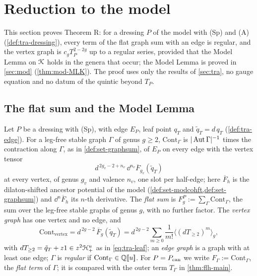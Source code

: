 
\section{Reduction to the model}
\label{sec:red}

This section proves Theorem R: for a dressing $P$ of the model with (Sp) and (A) (\cref{def:tra-dressing}), every term of the flat graph sum with an edge is regular, and the vertex graph is $c_gT_P^{2-2g}$ up to a regular series, provided that the Model Lemma on $\mathcal{K}$ holds in the genera that occur; the Model Lemma is proved in \cref{sec:mod} (\cref{thm:mod-MLK}). The proof uses only the results of \cref{sec:tra}, no gauge equation and no datum of the quintic beyond $T_P$.

\subsection{The flat sum and the Model Lemma}
\label{sec:red-sum}

\begin{defn}
\label{def:red-flatsum}
Let $P$ be a dressing with (Sp), with edge $E_P$, leaf point $q_T$ and $\tilde q_T = d\,q_T$ (\cref{def:tra-edge}). For a leg-free stable graph $\Gamma$ of genus $g\geq 2$, $\mathrm{Cont}_\Gamma$ is $|\operatorname{Aut}\Gamma|^{-1}$ times the contraction along $\Gamma$, as in \cref{def:set-graphsum}, of $E_P$ on every edge with the vertex tensor
\[
d^{\,2g_v-2+n_v}\,\dd^{n_v}\overline F_{g_v}(\tilde q_T)
\]
at every vertex, of genus $g_v$ and valence $n_v$, one slot per half-edge; here $\overline F_h$ is the dilaton-shifted ancestor potential of the model (\cref{def:set-modcohft,def:set-graphsum}) and $\dd^n\overline F_h$ its $n$-th derivative. The \emph{flat sum} is $F^P_g := \sum_\Gamma\mathrm{Cont}_\Gamma$, the sum over the leg-free stable graphs of genus $g$, with no further factor. The \emph{vertex graph} has one vertex and no edge, and
\begin{equation}
\label{eq:red-vertex}
\mathrm{Cont}_{\mathrm{vertex}} = d^{\,2g-2}\,\overline F_g(\tilde q_T) = d^{\,2g-2}\sum_{m\geq 0}\frac1{m!}\langle(dT_{\geq 2})^m\rangle_g ,
\end{equation}
with $dT_{\geq 2} = \tilde q_T+z1\in z^2\mathcal{H}^u_+$ as in \eqref{eq:tra-leaf};
an \emph{edge graph} is a graph with at least one edge; $\Gamma$ is \emph{regular} if $\mathrm{Cont}_\Gamma\in\mathbb{Q}[\![ u ]\!]$. For $P = P_{\mathrm{can}}$ we write $F_\Gamma := \mathrm{Cont}_\Gamma$, the \emph{flat term} of $\Gamma$; it is compared with the outer term $T_\Gamma$ in \cref{thm:flh-main}.
\end{defn}

